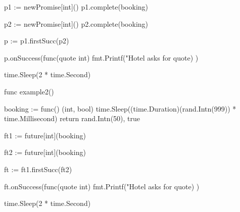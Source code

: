 \documentclass[landscape, a4paper]{article}
\begin{document}
\begin{minipage}[t]{0.2\linewidth}
\begin{betterlist}
{\begin{dnumberedcodebox}[minted language=go,minted options={autogobble, fontsize=\small}, box align=top]
{            p1 := newPromise[int]()
            p1.complete(booking)

            p2 := newPromise[int]()
            p2.complete(booking)

            p := p1.firstSucc(p2)

            p.onSuccess(func(quote int) {
                fmt.Printf("Hotel asks for %
                  quote)
            })

            time.Sleep(2 * time.Second)
        }

        func example2() {
            booking := func() (int, bool) {
                time.Sleep((time.Duration)(rand.Intn(999)) 
                  * time.Millisecond)
                return rand.Intn(50), true
            }

            ft1 := future[int](booking)

            ft2 := future[int](booking)

            ft := ft1.firstSucc(ft2)

            ft.onSuccess(func(quote int) {
                fmt.Printf("Hotel asks for %
                  quote)
            })

            time.Sleep(2 * time.Second)
        }
        \end{dnumberedcodebox}
		}
	\end{betterlist}
\end{minipage}
\end{document}
